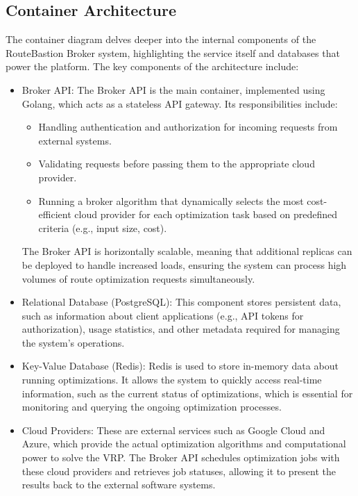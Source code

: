 \documentclass[english,notblind]{sbc20}
\begin{document}
\subsection{Container Architecture}
\label{sec:container_architecture}

The container diagram delves deeper into the internal components of the RouteBastion Broker system, highlighting the service itself and databases that power the platform. The key components of the architecture include:

\begin{itemize}
  \item Broker API: The Broker API is the main container, implemented using Golang, which acts as a stateless API gateway. Its responsibilities include:
        \begin{itemize}
          \item Handling authentication and authorization for incoming requests from external systems.
          \item Validating requests before passing them to the appropriate cloud provider.
          \item Running a broker algorithm that dynamically selects the most cost-efficient cloud provider for each optimization task based on predefined criteria (e.g., input size, cost).
        \end{itemize}

        The Broker API is horizontally scalable, meaning that additional replicas can be deployed to handle increased loads, ensuring the system can process high volumes of route optimization requests simultaneously.

  \item Relational Database (PostgreSQL): This component stores persistent data, such as information about client applications (e.g., API tokens for authorization), usage statistics, and other metadata required for managing the system's operations.

  \item Key-Value Database (Redis): Redis is used to store in-memory data about running optimizations. It allows the system to quickly access real-time information, such as the current status of optimizations, which is essential for monitoring and querying the ongoing optimization processes.

  \item Cloud Providers: These are external services such as Google Cloud and Azure, which provide the actual optimization algorithms and computational power to solve the VRP. The Broker API schedules optimization jobs with these cloud providers and retrieves job statuses, allowing it to present the results back to the external software systems.
\end{itemize}
\end{document}
